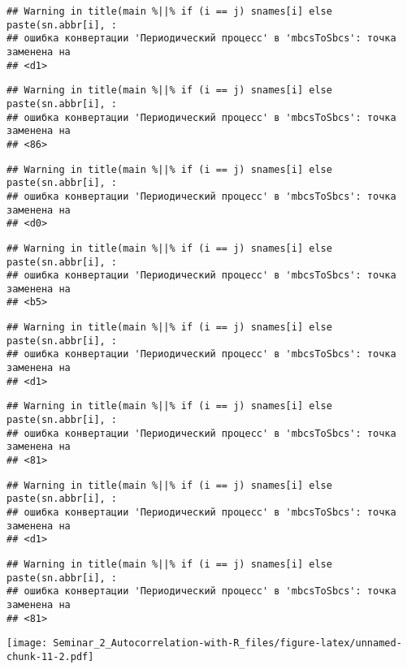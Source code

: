 \documentclass[
]{article}
\begin{document}
\begin{verbatim}
## Warning in title(main %||% if (i == j) snames[i] else paste(sn.abbr[i], :
## ошибка конвертации 'Периодический процесс' в 'mbcsToSbcs': точка заменена на
## <d1>
\end{verbatim}

\begin{verbatim}
## Warning in title(main %||% if (i == j) snames[i] else paste(sn.abbr[i], :
## ошибка конвертации 'Периодический процесс' в 'mbcsToSbcs': точка заменена на
## <86>
\end{verbatim}

\begin{verbatim}
## Warning in title(main %||% if (i == j) snames[i] else paste(sn.abbr[i], :
## ошибка конвертации 'Периодический процесс' в 'mbcsToSbcs': точка заменена на
## <d0>
\end{verbatim}

\begin{verbatim}
## Warning in title(main %||% if (i == j) snames[i] else paste(sn.abbr[i], :
## ошибка конвертации 'Периодический процесс' в 'mbcsToSbcs': точка заменена на
## <b5>
\end{verbatim}

\begin{verbatim}
## Warning in title(main %||% if (i == j) snames[i] else paste(sn.abbr[i], :
## ошибка конвертации 'Периодический процесс' в 'mbcsToSbcs': точка заменена на
## <d1>
\end{verbatim}

\begin{verbatim}
## Warning in title(main %||% if (i == j) snames[i] else paste(sn.abbr[i], :
## ошибка конвертации 'Периодический процесс' в 'mbcsToSbcs': точка заменена на
## <81>
\end{verbatim}

\begin{verbatim}
## Warning in title(main %||% if (i == j) snames[i] else paste(sn.abbr[i], :
## ошибка конвертации 'Периодический процесс' в 'mbcsToSbcs': точка заменена на
## <d1>
\end{verbatim}

\begin{verbatim}
## Warning in title(main %||% if (i == j) snames[i] else paste(sn.abbr[i], :
## ошибка конвертации 'Периодический процесс' в 'mbcsToSbcs': точка заменена на
## <81>
\end{verbatim}

\texttt{[image: Seminar\_2\_Autocorrelation-with-R\_files/figure-latex/unnamed-chunk-11-2.pdf]}
\end{document}
